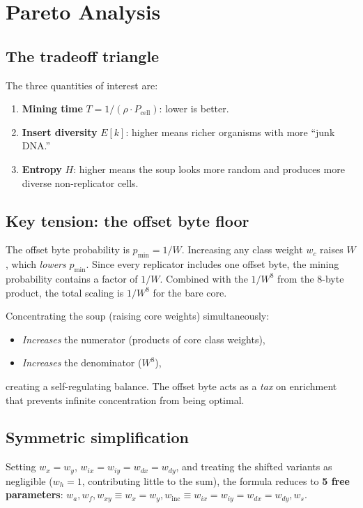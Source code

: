 \documentclass{article}
\newcommand{\wa}{w_a}
\newcommand{\wf}{w_f}
\newcommand{\wx}{w_x}
\newcommand{\wy}{w_y}
\newcommand{\wix}{w_{ix}}
\newcommand{\wiy}{w_{iy}}
\newcommand{\wdx}{w_{dx}}
\newcommand{\wdy}{w_{dy}}
\newcommand{\wh}{w_h}
\newcommand{\ws}{w_s}
\newcommand{\pmin}{p_{\min}}
\begin{document}
\section{Pareto Analysis}
\label{sec:pareto}

\subsection{The tradeoff triangle}

The three quantities of interest are:
\begin{enumerate}
\item \textbf{Mining time} $T = 1/(\rho \cdot P_{\text{cell}})$:
      lower is better.
\item \textbf{Insert diversity} $E[k]$: higher means richer
      organisms with more ``junk DNA.''
\item \textbf{Entropy} $H$: higher means the soup looks more random
      and produces more diverse non-replicator cells.
\end{enumerate}

\subsection{Key tension: the offset byte floor}

The offset byte probability is $\pmin = 1/W$.  Increasing any class
weight $w_c$ raises $W$, which \emph{lowers} $\pmin$.  Since every
replicator includes one offset byte, the mining probability contains
a factor of $1/W$.  Combined with the $1/W^8$ from the 8-byte product,
the total scaling is $1/W^8$ for the bare core.

Concentrating the soup (raising core weights) simultaneously:
\begin{itemize}
\item \emph{Increases} the numerator (products of core class weights),
\item \emph{Increases} the denominator ($W^8$),
\end{itemize}
creating a self-regulating balance.  The offset byte acts as a
\emph{tax} on enrichment that prevents infinite concentration from
being optimal.

\subsection{Symmetric simplification}

Setting $\wx = \wy$, $\wix = \wiy = \wdx = \wdy$, and treating
the shifted variants as negligible ($\wh = 1$, contributing
little to the sum), the formula reduces to \textbf{5 free parameters}:
$\wa, \wf, w_{xy} \equiv \wx = \wy,
 w_{\mathrm{inc}} \equiv \wix = \wiy = \wdx = \wdy, \ws$.
\end{document}
